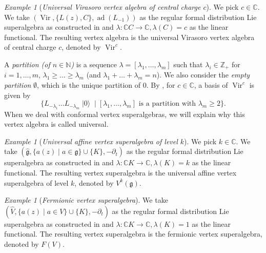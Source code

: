 \documentclass[a4paper, 12pt, reqno]{amsart}
\theoremstyle{remark}
\newtheorem{example}[theorem]{Example}
\DeclareMathOperator{\Vir}{Vir}
\DeclareMathOperator{\vac}{|0\rangle}
\DeclareMathOperator{\ad}{ad}
\begin{document}
\begin{example}[\emph{Universal Virasoro vertex algebra of central charge $c$}]
  \label{exa:5}
  We pick $c \in \mathbb{C}$.
  We take $(\Vir, \{L(z), C\}, \ad(L_{-1}))$ as the regular formal distribution Lie superalgebra as constructed in  and $\lambda: \mathbb{C}C \to \mathbb{C}, \lambda(C) = c$ as the linear functional.
  The resulting vertex algebra is the universal Virasoro vertex algebra of central charge $c$, denoted by $\Vir^c$.

  A \emph{partition (of $n \in \mathbb{N}$)} is a sequence $\lambda = [\lambda_1, \dots, \lambda_m]$ such that $\lambda_i \in \mathbb{Z}_+$ for $i = 1, \dots, m$, $\lambda_1 \ge \dots \ge \lambda_m$ (and $\lambda_1 + \dots + \lambda_m = n$).
  We also consider the \emph{empty partition} $\emptyset$, which is the unique partition of $0$.
  By , for $c \in \mathbb{C}$, a basis of $\Vir^c$ is given by
  \begin{equation*}
    \{L_{-\lambda_1}\dots L_{-\lambda_m}\vac \mid \text{$[\lambda_1, \dots, \lambda_m]$ is a partition with $\lambda_m \ge 2$}\}.
  \end{equation*}
  When we deal with conformal vertex superalgebras, we will explain why this vertex algebra is called universal.
\end{example}

\begin{example}[\emph{Universal affine vertex superalgebra of level $k$}]
  \label{exa:6}
  We pick $k \in \mathbb{C}$.
  We take $(\hat{\mathfrak{g}}, \{a(z) \mid a \in \mathfrak{g}\} \cup \{K\}, -\partial_t)$ as the regular formal distribution Lie superalgebra as constructed in  and $\lambda: \mathbb{C}K \to \mathbb{C}, \lambda(K) = k$ as the linear functional.
  The resulting vertex superalgebra is the universal affine vertex superalgebra of level $k$, denoted by $V^k(\mathfrak{g})$.
\end{example}

\begin{example}[\emph{Fermionic vertex superalgebra}]
  \label{exa:7}
  We take $(\widehat{V}, \{a(z) \mid a \in V\} \cup \{K\}, -\partial_t)$ as the regular formal distribution Lie superalgebra as constructed in  and $\lambda: \mathbb{C}K \to \mathbb{C}, \lambda(K) = 1$ as the linear functional.
  The resulting vertex superalgebra is the fermionic vertex superalgebra, denoted by $F(V)$.
\end{example}
\end{document}
